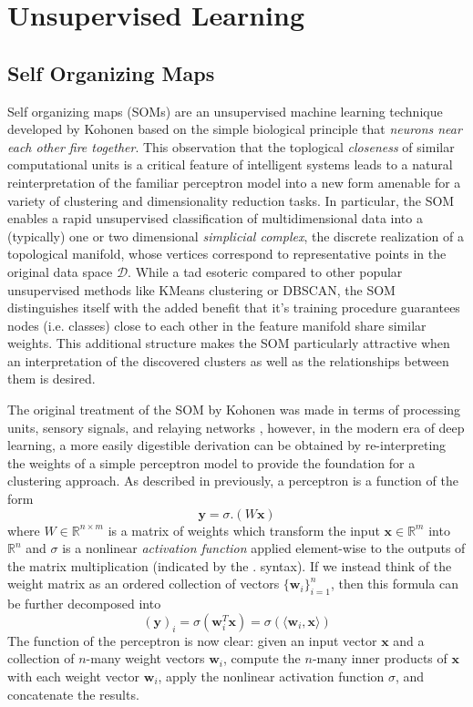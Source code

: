 \section{Unsupervised Learning}

\subsection{Self Organizing Maps}

Self organizing maps (SOMs) are an unsupervised machine learning technique developed by Kohonen \cite{kohonen-original} based on the simple biological principle that \textit{neurons near each other fire together}. This observation that the toplogical \textit{closeness} of similar computational units is a critical feature of intelligent systems leads to a natural reinterpretation of the familiar perceptron model into a new form amenable for a variety of clustering and dimensionality reduction tasks. In particular, the SOM enables a rapid unsupervised classification of multidimensional data into a (typically) one or two dimensional \textit{simplicial complex}, the discrete realization of a topological manifold, whose vertices correspond to representative points in the original data space $\mathcal{D}$. While a tad esoteric compared to other popular unsupervised methods like KMeans clustering or DBSCAN, the SOM distinguishes itself with the added benefit that it's training procedure guarantees nodes (i.e. classes) close to each other in the feature manifold share similar weights. This additional structure makes the SOM particularly attractive when an interpretation of the discovered clusters as well as the relationships between them is desired.

The original treatment of the SOM by Kohonen was made in terms of processing units, sensory signals, and relaying networks \cite{kohonen-original}, however, in the modern era of deep learning, a more easily digestible derivation can be obtained by re-interpreting the weights of a simple perceptron model to provide the foundation for a clustering approach. As described in previously, a perceptron is a function of the form
\begin{equation}
    \mathbf{y} = \sigma.\left(W\mathbf{x}\right)
\end{equation}
where $W\in\mathbb{R}^{n\times m}$ is a matrix of weights which transform the input $\mathbf{x}\in\mathbb{R}^m$ into $\mathbb{R}^n$ and $\sigma$ is a nonlinear \textit{activation function} applied element-wise to the outputs of the matrix multiplication (indicated by the $.$ syntax). If we instead think of the weight matrix as an ordered collection of vectors $\{\mathbf{w}_i\}_{i=1}^{n}$, then this formula can be further decomposed into
\begin{equation}
    (\mathbf{y})_i = \sigma(\mathbf{w}_i^T\mathbf{x}) = \sigma(\langle \mathbf{w}_i, \mathbf{x} \rangle)
\end{equation}
The function of the perceptron is now clear: given an input vector $\mathbf{x}$ and a collection of $n$-many weight vectors $\mathbf{w}_i$, compute the $n$-many inner products of $\mathbf{x}$ with each weight vector $\mathbf{w}_i$, apply the nonlinear activation function $\sigma$, and concatenate the results.

